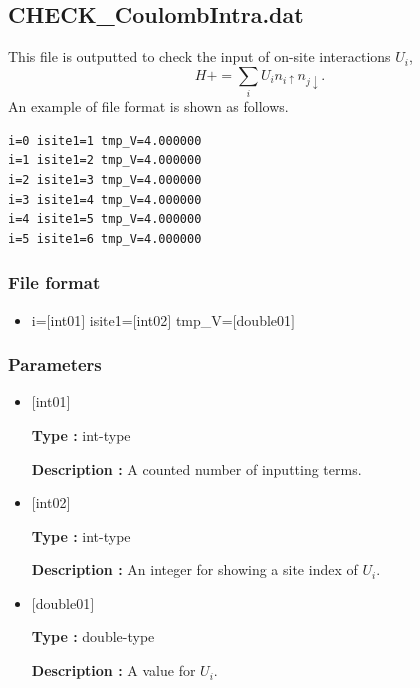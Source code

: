\newpage
\subsection{CHECK\_CoulombIntra.dat}
This file is outputted to check the input of on-site interactions $U_i$,
\begin{equation}
H+=\sum_{i} U_i n_{i\uparrow} n_{j \downarrow}.
\end{equation}
An example of file format is shown as follows.

\begin{minipage}{12.5cm}
\begin{screen}
\begin{verbatim}
i=0 isite1=1 tmp_V=4.000000 
i=1 isite1=2 tmp_V=4.000000 
i=2 isite1=3 tmp_V=4.000000 
i=3 isite1=4 tmp_V=4.000000 
i=4 isite1=5 tmp_V=4.000000 
i=5 isite1=6 tmp_V=4.000000 
\end{verbatim}
\end{screen}
\end{minipage}

\subsubsection{File format}
 \begin{itemize}
   \item  i=$[$int01$]$ isite1=$[$int02$]$  tmp\_V=$[$double01$]$ 
 \end{itemize}
 
\subsubsection{Parameters}
 \begin{itemize}

    \item  $[$int01$]$ 
   
    {\bf Type :} int-type

   {\bf Description :} A counted number of inputting terms.
      
   \item  $[$int02$]$
   
    {\bf Type :} int-type

    {\bf Description :}   An integer for showing a site index of $U_i$.
    
   \item  $[$double01$]$ 
   
    {\bf Type :} double-type

   {\bf Description :} A value for $U_i$.
\end{itemize}

